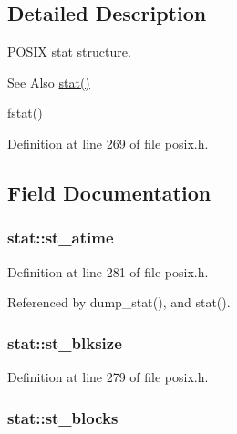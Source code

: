 \subsection{Detailed Description}
P\-O\-S\-I\-X stat structure. 

\begin{DoxySeeAlso}{See Also}
\hyperlink{posix_8c_abef70bf7a4af8a1f4998db0035c51781}{stat()} 

\hyperlink{posix_8h_a85e86e70773c0a204346f965272bd364}{fstat()} 
\end{DoxySeeAlso}


Definition at line 269 of file posix.\-h.



\subsection{Field Documentation}
\hypertarget{structstat_ab74d1e7e345e88b9d0fb2688a97cba64}{
\subsubsection[{st\-\_\-atime}]{ stat\-::st\-\_\-atime}}\label{structstat_ab74d1e7e345e88b9d0fb2688a97cba64}


Definition at line 281 of file posix.\-h.



Referenced by dump\-\_\-stat(), and stat().

\hypertarget{structstat_a38d474e1ae3cf6fbdde89ac3c3e308f1}{
\subsubsection[{st\-\_\-blksize}]{ stat\-::st\-\_\-blksize}}\label{structstat_a38d474e1ae3cf6fbdde89ac3c3e308f1}


Definition at line 279 of file posix.\-h.

\hypertarget{structstat_a42dd716b2f9234f961d949fc9500eefb}{
\subsubsection[{st\-\_\-blocks}]{ stat\-::st\-\_\-blocks}}\label{structstat_a42dd716b2f9234f961d949fc9500eefb}


